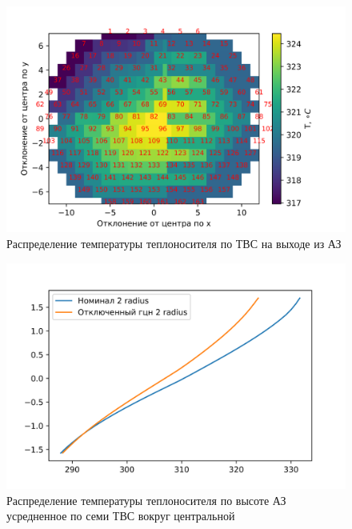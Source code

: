 \begin{figure}[H]
	\begin{center}
		\includegraphics{treton_one_gcn_t_all_cells_z_is_29.png}
		\caption{Распределение температуры теплоносителя по ТВС на выходе из АЗ}
		\label{pic:treton-one-gcn-t-all-cells-is-29} %
	\end{center}
\end{figure}

\begin{figure}[H]
	\begin{center}
		\includegraphics{treton_one_gcn_2_radius_T.png}
		\caption{Распределение температуры теплоносителя по высоте АЗ усредненное по семи ТВС вокруг центральной}
		\label{pic:treton-one-gcn-2-radius-T} %
	\end{center}
\end{figure}